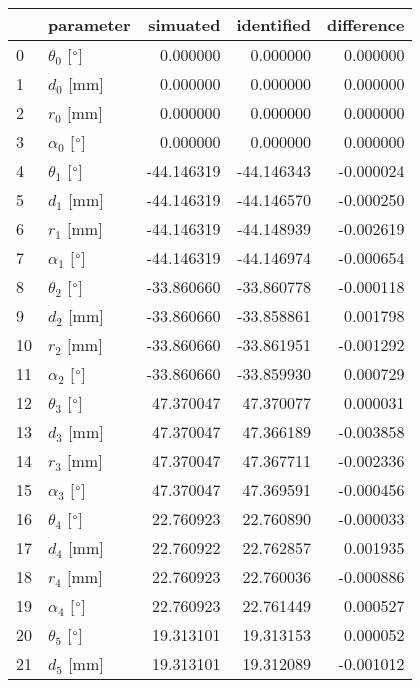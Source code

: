 \documentclass{standalone}%
\begin{document}
%
\normalsize%
\begin{tabular}{llrrr}
\toprule
{} &                 parameter &   simuated & identified & difference \\
\midrule
0  &  $\theta_{0}$ [$\degree$] &   0.000000 &   0.000000 &   0.000000 \\
1  &              $d_{0}$ [mm] &   0.000000 &   0.000000 &   0.000000 \\
2  &              $r_{0}$ [mm] &   0.000000 &   0.000000 &   0.000000 \\
3  &  $\alpha_{0}$ [$\degree$] &   0.000000 &   0.000000 &   0.000000 \\
4  &  $\theta_{1}$ [$\degree$] & -44.146319 & -44.146343 &  -0.000024 \\
5  &              $d_{1}$ [mm] & -44.146319 & -44.146570 &  -0.000250 \\
6  &              $r_{1}$ [mm] & -44.146319 & -44.148939 &  -0.002619 \\
7  &  $\alpha_{1}$ [$\degree$] & -44.146319 & -44.146974 &  -0.000654 \\
8  &  $\theta_{2}$ [$\degree$] & -33.860660 & -33.860778 &  -0.000118 \\
9  &              $d_{2}$ [mm] & -33.860660 & -33.858861 &   0.001798 \\
10 &              $r_{2}$ [mm] & -33.860660 & -33.861951 &  -0.001292 \\
11 &  $\alpha_{2}$ [$\degree$] & -33.860660 & -33.859930 &   0.000729 \\
12 &  $\theta_{3}$ [$\degree$] &  47.370047 &  47.370077 &   0.000031 \\
13 &              $d_{3}$ [mm] &  47.370047 &  47.366189 &  -0.003858 \\
14 &              $r_{3}$ [mm] &  47.370047 &  47.367711 &  -0.002336 \\
15 &  $\alpha_{3}$ [$\degree$] &  47.370047 &  47.369591 &  -0.000456 \\
16 &  $\theta_{4}$ [$\degree$] &  22.760923 &  22.760890 &  -0.000033 \\
17 &              $d_{4}$ [mm] &  22.760922 &  22.762857 &   0.001935 \\
18 &              $r_{4}$ [mm] &  22.760923 &  22.760036 &  -0.000886 \\
19 &  $\alpha_{4}$ [$\degree$] &  22.760923 &  22.761449 &   0.000527 \\
20 &  $\theta_{5}$ [$\degree$] &  19.313101 &  19.313153 &   0.000052 \\
21 &              $d_{5}$ [mm] &  19.313101 &  19.312089 &  -0.001012 \\

\end{tabular}
\end{document}
